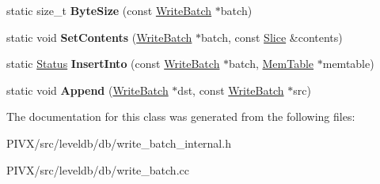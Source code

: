 \begin{DoxyCompactItemize}
static size\+\_\+t {\bfseries Byte\+Size} (const \mbox{\hyperlink{classleveldb_1_1_write_batch}{Write\+Batch}} $\ast$batch)
\item 
\mbox{\label{classleveldb_1_1_write_batch_internal_aa07e75250aed00d06f2e4df85ee926b9}} 
static void {\bfseries Set\+Contents} (\mbox{\hyperlink{classleveldb_1_1_write_batch}{Write\+Batch}} $\ast$batch, const \mbox{\hyperlink{classleveldb_1_1_slice}{Slice}} \&contents)
\item 
\mbox{\label{classleveldb_1_1_write_batch_internal_a102aae14259fd277e2576338ce3e5551}} 
static \mbox{\hyperlink{classleveldb_1_1_status}{Status}} {\bfseries Insert\+Into} (const \mbox{\hyperlink{classleveldb_1_1_write_batch}{Write\+Batch}} $\ast$batch, \mbox{\hyperlink{classleveldb_1_1_mem_table}{Mem\+Table}} $\ast$memtable)
\item 
\mbox{\label{classleveldb_1_1_write_batch_internal_ac83c9a45a815c16ad8602b99b752b4bc}} 
static void {\bfseries Append} (\mbox{\hyperlink{classleveldb_1_1_write_batch}{Write\+Batch}} $\ast$dst, const \mbox{\hyperlink{classleveldb_1_1_write_batch}{Write\+Batch}} $\ast$src)
\end{DoxyCompactItemize}


The documentation for this class was generated from the following files\+:\begin{DoxyCompactItemize}
\item 
P\+I\+V\+X/src/leveldb/db/write\+\_\+batch\+\_\+internal.\+h\item 
P\+I\+V\+X/src/leveldb/db/write\+\_\+batch.\+cc\end{DoxyCompactItemize}
